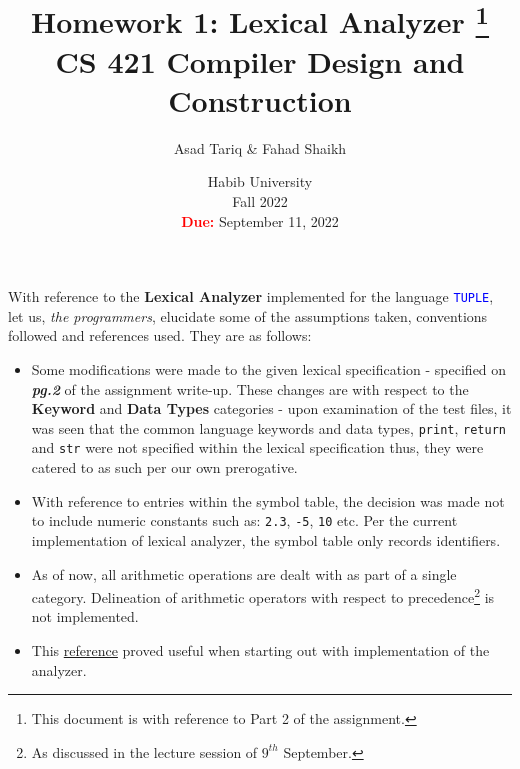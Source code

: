 \documentclass[a4paper, 10pt, oneside]{article}
\title{Homework 1: Lexical Analyzer \footnote{This document is with reference to Part 2 of the assignment.}\\CS 421 Compiler Design and Construction}
\author{Asad Tariq \& Fahad Shaikh}
\date{Habib University\\Fall 2022\\\textbf{\textcolor{red}{Due:}} September 11, 2022}
\begin{document}
\maketitle
\noindent
With reference to the \textbf{Lexical Analyzer} implemented for the language \texttt{\textcolor{blue}{TUPLE}}, let us, \textit{the programmers},
elucidate some of the assumptions taken, conventions followed and references used. They are as follows:
\begin{itemize}
    \item Some modifications were made to the given lexical specification - specified on \emph{\textbf{pg.2}} of the assignment write-up. These changes
    are with respect to the \textbf{Keyword} and \textbf{Data Types} categories - upon examination of the test files, it was seen that the common language
    keywords and data types, \texttt{print}, \texttt{return} and \texttt{str} were not specified within the lexical specification thus, they were catered to
    as such per our own prerogative.
    \item With reference to entries within the symbol table, the decision was made not to include numeric constants such as: \texttt{2.3}, \texttt{-5}, \texttt{10} etc. Per the
    current implementation of lexical analyzer, the symbol table only records identifiers.
    \item As of now, all arithmetic operations are dealt with as part of a single category. Delineation of arithmetic operators with respect to precedence\footnote{As discussed in the lecture session of $9^{th}$ September.} is not implemented.
    \item This \href{https://austinhenley.com/blog/teenytinycompiler1.html}{reference} proved useful when starting out with implementation of the analyzer.
\end{itemize}
\end{document}
